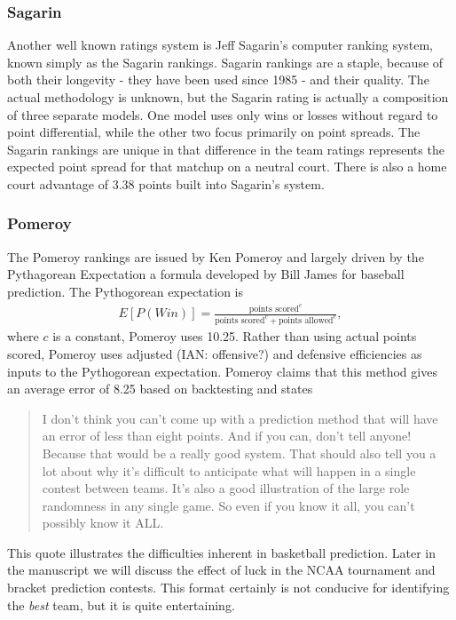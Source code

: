 \subsubsection{Sagarin}
Another well known ratings system is Jeff Sagarin's computer ranking system, known simply as the Sagarin rankings.  Sagarin rankings are a staple, because of both their longevity  - they have been used since 1985 - and their quality.  The actual methodology is unknown, but the Sagarin rating is actually a composition of three separate models.  One model uses only wins or losses without regard to point differential, while the other two focus primarily on point spreads.  The Sagarin rankings are unique in that difference in the team ratings represents the expected point spread for that matchup on a neutral court.  There is also a home court advantage of 3.38 points built into Sagarin's system.

\subsubsection{Pomeroy}
The Pomeroy rankings are issued by Ken Pomeroy and largely driven by the Pythagorean Expectation a formula developed by Bill James for baseball prediction.  The Pythogorean expectation is
\begin{eqnarray}
E[P(Win)] = \frac{\text{points scored}^c}{\text{points scored}^c + \text{points allowed}^c},
\end{eqnarray}
where $c$ is a constant, Pomeroy uses 10.25.  Rather than using actual points scored, Pomeroy uses adjusted (IAN: offensive?) and defensive efficiencies as inputs to the Pythogorean expectation.  Pomeroy claims that this method gives an average error of 8.25 based on backtesting and states
\begin{quotation}\noindent I don't think you can't come up with a prediction method that will have an error of less than eight points. And if you can, don't tell anyone! Because that would be a really good system. That should also tell you a lot about why it's difficult to anticipate what will happen in a single contest between teams. It's also a good illustration of the large role randomness in any single game. So even if you know it all, you can't possibly know it ALL.
\end{quotation}
This quote illustrates the difficulties inherent in basketball prediction.  Later in the manuscript we will discuss the effect of luck in the NCAA tournament and bracket prediction contests.  This format certainly is not conducive for identifying the \emph{best} team, but it is quite entertaining.
